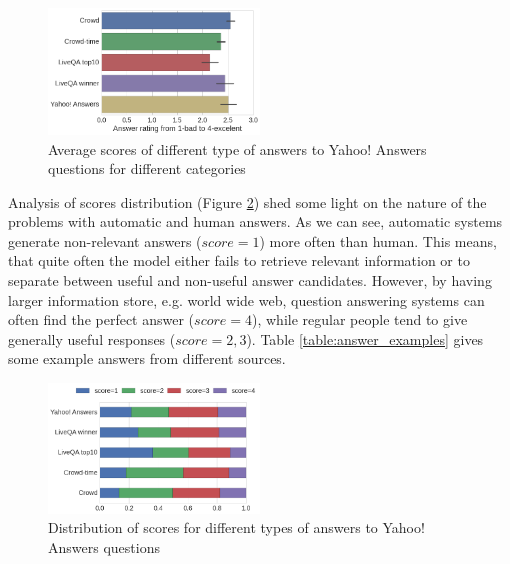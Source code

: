 \documentclass[11pt,letterpaper]{article}
\begin{document}
\begin{figure}[h]
	\centering
	\includegraphics[width=0.5\textwidth]{img/average_score}
	\caption{Average scores of different type of answers to Yahoo! Answers questions for different categories}
	\label{fig:average_score}
\end{figure}

Analysis of scores distribution (Figure \ref{fig:scores_distribution}) shed some light on the nature of the problems with automatic and human answers.
As we can see, automatic systems generate non-relevant answers ($score=1$) more often than human.
This means, that quite often the model either fails to retrieve relevant information or to separate between useful and non-useful answer candidates.
However, by having larger information store, e.g. world wide web, question answering systems can often find the perfect answer ($score=4$), while regular people tend to give generally useful responses ($score=2,3$).
Table \ref{table:answer_examples} gives some example answers from different sources.

\begin{figure}[h]
\centering
\includegraphics[width=0.5\textwidth]{img/scores_distribution}
\caption{Distribution of scores for different types of answers to Yahoo! Answers questions}
\label{fig:scores_distribution}
\end{figure}
\end{document}

